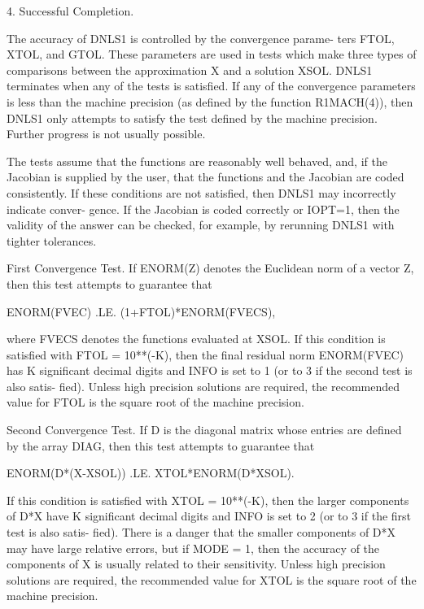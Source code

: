 \documentclass[11pt,twoside,nolof]{starlink}
\begin{document}
\begin{terminalv}
 4. Successful Completion.

       The accuracy of DNLS1 is controlled by the convergence parame-
       ters FTOL, XTOL, and GTOL.  These parameters are used in tests
       which make three types of comparisons between the approximation
       X and a solution XSOL.  DNLS1 terminates when any of the tests
       is satisfied.  If any of the convergence parameters is less than
       the machine precision (as defined by the function R1MACH(4)),
       then DNLS1 only attempts to satisfy the test defined by the
       machine precision.  Further progress is not usually possible.

       The tests assume that the functions are reasonably well behaved,
       and, if the Jacobian is supplied by the user, that the functions
       and the Jacobian are coded consistently.  If these conditions
       are not satisfied, then DNLS1 may incorrectly indicate conver-
       gence.  If the Jacobian is coded correctly or IOPT=1,
       then the validity of the answer can be checked, for example, by
       rerunning DNLS1 with tighter tolerances.

       First Convergence Test.  If ENORM(Z) denotes the Euclidean norm
         of a vector Z, then this test attempts to guarantee that

               ENORM(FVEC) .LE. (1+FTOL)*ENORM(FVECS),

         where FVECS denotes the functions evaluated at XSOL.  If this
         condition is satisfied with FTOL = 10**(-K), then the final
         residual norm ENORM(FVEC) has K significant decimal digits and
         INFO is set to 1 (or to 3 if the second test is also satis-
         fied).  Unless high precision solutions are required, the
         recommended value for FTOL is the square root of the machine
         precision.

       Second Convergence Test.  If D is the diagonal matrix whose
         entries are defined by the array DIAG, then this test attempts
         to guarantee that

               ENORM(D*(X-XSOL)) .LE. XTOL*ENORM(D*XSOL).

         If this condition is satisfied with XTOL = 10**(-K), then the
         larger components of D*X have K significant decimal digits and
         INFO is set to 2 (or to 3 if the first test is also satis-
         fied).  There is a danger that the smaller components of D*X
         may have large relative errors, but if MODE = 1, then the
         accuracy of the components of X is usually related to their
         sensitivity.  Unless high precision solutions are required,
         the recommended value for XTOL is the square root of the
         machine precision.


\end{terminalv}
\end{document}
